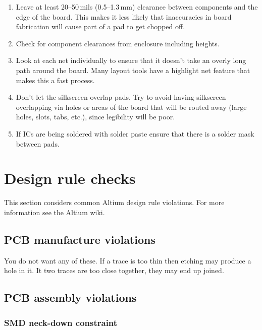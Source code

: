 \begin{enumerate}
\item Leave at least 20--50\,mils (0.5--1.3\,mm) clearance between
  components and the edge of the board. This makes it less likely that
  inaccuracies in board fabrication will cause part of a pad to get
  chopped off.

\item Check for component clearances from enclosure including heights.

\item Look at each net individually to ensure that it doesn't take an
  overly long path around the board. Many layout tools have a
  highlight net feature that makes this a fast process.

\item Don't let the silkscreen overlap pads. Try to avoid having
  silkscreen overlapping via holes or areas of the board that will be
  routed away (large holes, slots, tabs, etc.), since legibility will
  be poor.

\item If ICs are being soldered with solder paste ensure that there is
  a solder mask between pads.
 \end{enumerate}



\section{Design rule checks}


This section considers common Altium design rule violations.  For more
information see the Altium wiki.



\subsection{PCB manufacture violations}

You do not want any of these.  If a trace is too thin then etching may
produce a hole in it.  It two traces are too close together, they may
end up joined.


\subsection{PCB assembly violations}


\subsubsection{SMD neck-down constraint}

